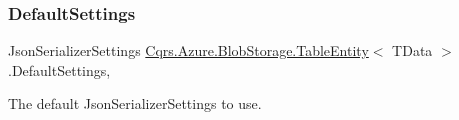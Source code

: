\subsubsection{\texorpdfstring{Default\+Settings}{DefaultSettings}}
{\footnotesize\ttfamily Json\+Serializer\+Settings \hyperlink{classCqrs_1_1Azure_1_1BlobStorage_1_1TableEntity}{Cqrs.\+Azure.\+Blob\+Storage.\+Table\+Entity}$<$ T\+Data $>$.Default\+Settings\hspace{0.3cm}{\ttfamily [static]}, {\ttfamily [get]}}



The default Json\+Serializer\+Settings to use. 

